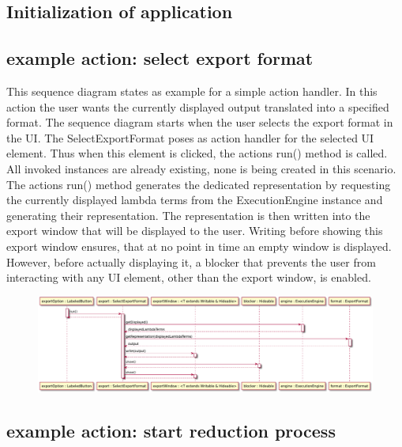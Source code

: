 \subsection{Initialization of application}

\subsection{example action: select export format}
This sequence diagram states as example for a simple action handler.
In this action the user wants the currently displayed output translated into a specified format. The sequence diagram starts when the user selects the export format in the UI. 
The SelectExportFormat poses as action handler for the selected UI element. Thus when this element is clicked, the actions run() method is called. All invoked instances are already existing, none is being created in this scenario.
The actions run() method generates the dedicated representation by requesting the currently displayed lambda terms from the ExecutionEngine instance and generating their representation.
The representation is then written into the export window that will be displayed to the user. Writing before showing this export window ensures, that at no point in time an empty window is displayed.
However, before actually displaying it, a blocker that prevents the user from interacting with any UI element, other than the export window, is enabled.

\begin{figure}[H]
	\centering
	\includegraphics[width=\textwidth]{sequenceDiagrams/exportOutput}
\end{figure}

\subsection{example action: start reduction process}

